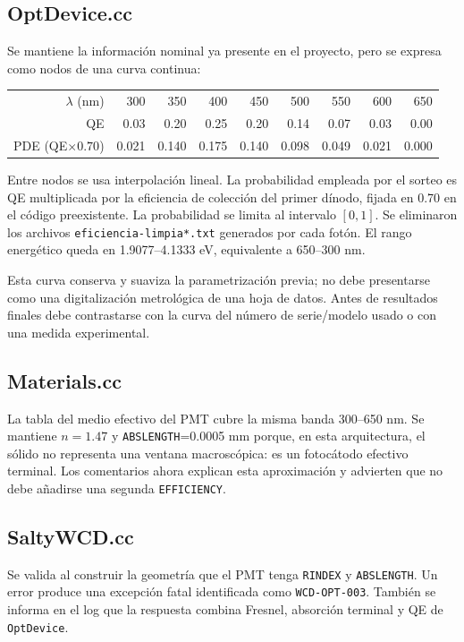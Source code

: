 \documentclass[11pt,a4paper]{article}
\begin{document}
\subsection{OptDevice.cc}
Se mantiene la información nominal ya presente en el proyecto, pero se expresa
como nodos de una curva continua:
\begin{center}
\begin{tabular}{rrrrrrrrr}
\toprule
$\lambda$ (nm)&300&350&400&450&500&550&600&650\\
QE&0.03&0.20&0.25&0.20&0.14&0.07&0.03&0.00\\
PDE (QE$\times0.70$)&0.021&0.140&0.175&0.140&0.098&0.049&0.021&0.000\\
\bottomrule
\end{tabular}
\end{center}
Entre nodos se usa interpolación lineal. La probabilidad empleada por el sorteo
es QE multiplicada por la eficiencia de colección del primer dínodo, fijada en
0.70 en el código preexistente. La probabilidad se limita al intervalo $[0,1]$.
Se eliminaron los archivos \texttt{eficiencia-limpia*.txt} generados por cada
fotón. El rango energético queda en 1.9077--4.1333 eV, equivalente a
650--300 nm.

Esta curva conserva y suaviza la parametrización previa; no debe presentarse
como una digitalización metrológica de una hoja de datos. Antes de resultados
finales debe contrastarse con la curva del número de serie/modelo usado o con
una medida experimental.

\subsection{Materials.cc}
La tabla del medio efectivo del PMT cubre la misma banda 300--650 nm. Se mantiene
$n=1.47$ y \texttt{ABSLENGTH}=0.0005 mm porque, en esta arquitectura, el sólido
no representa una ventana macroscópica: es un fotocátodo efectivo terminal.
Los comentarios ahora explican esta aproximación y advierten que no debe
añadirse una segunda \texttt{EFFICIENCY}.

\subsection{SaltyWCD.cc}
Se valida al construir la geometría que el PMT tenga \texttt{RINDEX} y
\texttt{ABSLENGTH}. Un error produce una excepción fatal identificada como
\texttt{WCD-OPT-003}. También se informa en el log que la respuesta combina
Fresnel, absorción terminal y QE de \texttt{OptDevice}.
\end{document}
